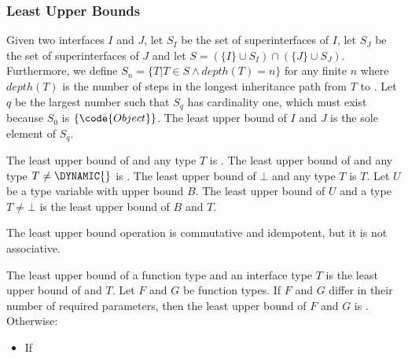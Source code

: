 \documentclass[makeidx]{article}
\begin{document}
{


\subsubsection{Least Upper Bounds}


\LMHash{}%
Given two interfaces $I$ and $J$,
let $S_I$ be the set of superinterfaces of $I$,
let $S_J$ be the set of superinterfaces of $J$
and let $S = (\{I\} \cup S_I) \cap (\{J\} \cup S_J)$.
Furthermore,
we define $S_n = \{T | T \in S \wedge depth(T) = n\}$ for any finite $n$
where $depth(T)$ is the number of steps in the longest inheritance path
from $T$ to .
Let $q$ be the largest number such that $S_q$ has cardinality one,
which must exist because $S_0$ is $\{\code{Object}\}$.
The least upper bound of $I$ and $J$ is the sole element of $S_q$.

\LMHash{}%
The least upper bound of \DYNAMIC{} and any type $T$ is \DYNAMIC{}.
The least upper bound of \VOID{} and any type $T \ne \DYNAMIC{}$ is \VOID{}.
The least upper bound of $\bot$ and any type $T$ is $T$.
Let $U$ be a type variable with upper bound $B$.
The least upper bound of $U$ and a type $T \ne \bot$ is the least upper bound of $B$ and $T$.

\LMHash{}%
The least upper bound operation is commutative and idempotent,
but it is not associative.



\LMHash{}%
The least upper bound of a function type and an interface type $T$ is the least upper bound of \FUNCTION{} and $T$.
Let $F$ and $G$ be function types.
If $F$ and $G$ differ in their number of required parameters,
then the least upper bound of $F$ and $G$ is \FUNCTION{}.
Otherwise:
\begin{itemize}
\item If


\end{itemize}}
\end{document}
